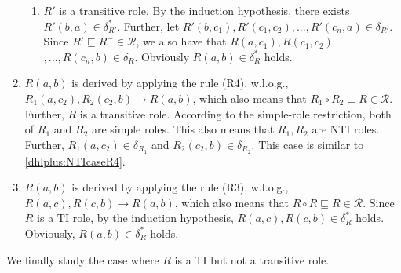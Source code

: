 \begin{enumerate}[leftmargin=12ex,label=Case~2.\arabic*, ref=Case~2.\arabic*]
\begin{enumerate}[leftmargin=8ex,label=Case~2.2.\arabic*]
     \item $R'$ is a transitive role.
        By the induction hypothesis, there exists $R'(b,a)\in\delta^*_{R'}$.
        Further, let $R'(b,c_1),R'(c_1,c_2),...,R'(c_n,a)\in\delta_{R'}$.
        Since $R'\sqsubseteq R^-\in\mathcal{R}$, we also have that
        $R(a,c_1),R(c_1,c_2)$ $,...,R(c_n,b)\in\delta_{R}$. Obviously $R(a,b)\in\delta^*_{R}$ holds.
    \end{enumerate}

\item $R(a,b)$ is derived by applying the rule (R4), w.l.o.g.,
    $R_1(a,c_2),R_2(c_2,b)\rightarrow R(a,b)$,
    which also means that $R_1\circ R_2\sqsubseteq R\in\mathcal{R}$.
    Further, $R$ is a transitive role. According to the simple-role restriction,
    both of $R_1$ and $R_2$ are simple roles.
    This also
    means that $R_1, R_2$ are NTI roles. Further, $R_1(a,c_2)\in\delta_{R_1}$ and $R_2(c_2,b)\in\delta_{R_2}$.
    This case is similar to \ref{dhlplus:NTIcaseR4}.

\item $R(a,b)$ is derived by applying the rule (R3), w.l.o.g., $R(a,c),R(c,b)\rightarrow R(a,b)$,
    which also means that $R\circ R\sqsubseteq R\in\mathcal{R}$.
    Since $R$ is a TI role, by the induction hypothesis,
    $R(a,c),R(c,b)\in\delta^*_{R}$ holds. Obviously, $R(a,b)\in\delta^*_{R}$ holds.
\end{enumerate}

We finally study the case where $R$ is a TI but not a transitive role.

